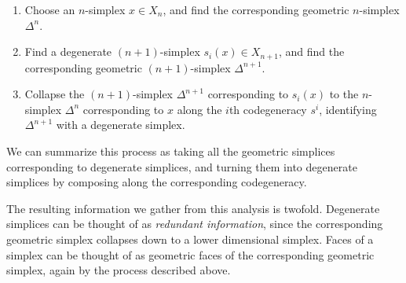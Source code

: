 \begin{remark}
\begin{itemize}
\begin{enumerate}
            \item Choose an $n$-simplex $x\in X_n$, and find the corresponding geometric $n$-simplex $\Delta^n$.
            \item Find a degenerate $(n+1)$-simplex $s_i(x)\in X_{n+1}$, and find the corresponding geometric $(n+1)$-simplex $\Delta^{n+1}$.
            \item Collapse the $(n+1)$-simplex $\Delta^{n+1}$ corresponding to $s_i(x)$ to the $n$-simplex $\Delta^n$ corresponding to $x$ along the $i$th codegeneracy $s^i$, identifying $\Delta^{n+1}$ with a degenerate simplex.
        \end{enumerate}
        We can summarize this process as taking all the geometric simplices corresponding to degenerate simplices, and turning them into degenerate simplices by composing along the corresponding codegeneracy.
    \end{itemize}
    The resulting information we gather from this analysis is twofold. Degenerate simplices can be thought of as \emph{redundant information}, since the corresponding geometric simplex collapses down to a lower dimensional simplex. Faces of a simplex can be thought of as geometric faces of the corresponding geometric simplex, again by the process described above.
\end{remark}

